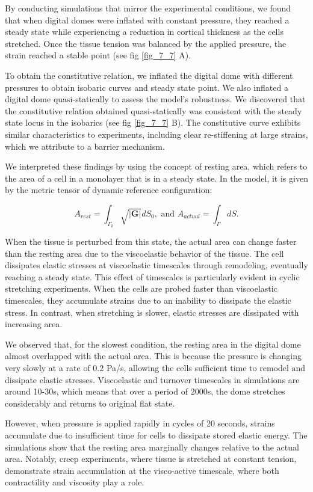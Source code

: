 By conducting simulations that mirror the experimental conditions, we found that when digital domes were inflated with constant pressure, they reached a steady state while experiencing a reduction in cortical thickness as the cells stretched. Once the tissue tension was balanced by the applied pressure, the strain reached a stable point (see fig \ref{fig_7_7} A).

To obtain the constitutive relation, we inflated the digital dome with different pressures to obtain isobaric curves and steady state point. We also inflated a digital dome quasi-statically to assess the model’s robustness. We discovered that the constitutive relation obtained quasi-statically was consistent with the steady state locus in the isobarics (see fig \ref{fig_7_7} B). The constitutive curve exhibits similar characteristics to experiments, including clear re-stiffening at large strains, which we attribute to a barrier mechanism.

We interpreted these findings by using the concept of resting area, which refers to the area of a cell in a monolayer that is in a steady state. In the model, it is given by the metric tensor of dynamic reference configuration:

$$ A_{rest} = \int_{\Gamma_0} \sqrt{|\mathbf{G}|}dS_0, \text{ and } A_{actual} = \int_{\Gamma}dS. $$

When the tissue is perturbed from this state, the actual area can change faster than the resting area due to the viscoelastic behavior of the tissue. The cell dissipates elastic stresses at viscoelastic timescales through remodeling, eventually reaching a steady state. This effect of timescales is particularly evident in cyclic stretching experiments. When the cells are probed faster than viscoelastic timescales, they accumulate strains due to an inability to dissipate the elastic stress. In contrast, when stretching is slower, elastic stresses are dissipated with increasing area.

We observed that, for the slowest condition, the resting area in the digital dome almost overlapped with the actual area. This is because the pressure is changing very slowly at a rate of 0.2 Pa/s, allowing the cells sufficient time to remodel and dissipate elastic stresses. Viscoelastic and turnover timescales in simulations are around 10-30s, which means that over a period of 2000s, the dome stretches considerably and returns to original flat state.

However, when pressure is applied rapidly in cycles of 20 seconds, strains accumulate due to insufficient time for cells to dissipate stored elastic energy. The simulations show that the resting area marginally changes relative to the actual area. Notably, creep experiments, where tissue is stretched at constant tension, demonstrate strain accumulation at the visco-active timescale, where both contractility and viscosity play a role.

